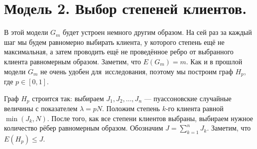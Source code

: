 \documentclass{matmex-diploma-custom}
\newcommand{\leqs}{\leqslant}
\theoremstyle{named}
\begin{document}
\newpage
\section*{Модель 2. Выбор степеней клиентов.}
В этой модели $G_m$ будет устроен немного другим образом. На сей раз за каждый шаг мы будем равномерно выбирать клиента, 
у которого степень ещё не максимальная, а затем проводить ещё не проведённое ребро от выбранного клиента равномерным образом.
Заметим, что $E(G_m) = m$. Как и в прошлой модели $G_m$ не очень удобен для~исследования, поэтому мы построим граф $H_p$, где $p \in [0,1]$.

Граф $H_p$ строится так: выбираем $J_1, J_2, \dots, J_n$ --- пуассоновские случайные величины с показателем $\lambda = pN$.
Положим степень $k$-го клиента равной $\min(J_k, N)$. После того, как все степени клиентов выбраны, 
выбираем нужное количество рёбер равномерным образом. Обозначим $J = \sum\limits_{k=1}^n J_k$. Заметим, что $E(H_p) \leqs J$.
\end{document}
